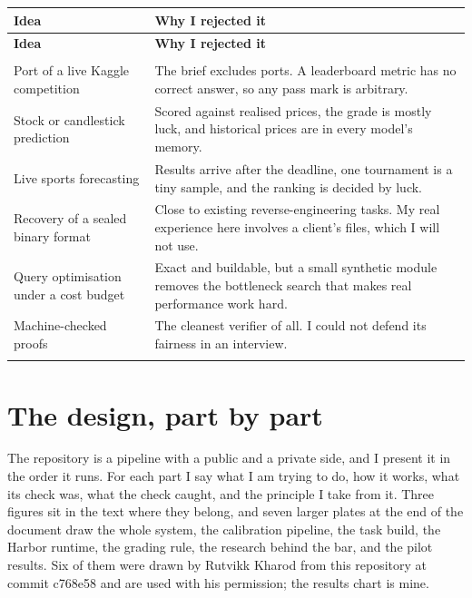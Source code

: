 \documentclass[11pt,letterpaper]{article}
\begin{document}
\begin{small}
\begin{longtable}{>{\raggedright\arraybackslash}p{}>{\raggedright\arraybackslash}p{}}
\toprule
\textbf{Idea} & \textbf{Why I rejected it} \\ \midrule
\endfirsthead
\toprule
\textbf{Idea} & \textbf{Why I rejected it} \\ \midrule
\endhead
\midrule \multicolumn{2}{r}{\footnotesize continued on the next page} \\ \endfoot
\bottomrule \endlastfoot
Port of a live Kaggle competition & The brief excludes ports. A leaderboard metric has no correct answer, so any pass mark is arbitrary. \\ \addlinespace[2pt]
Stock or candlestick prediction & Scored against realised prices, the grade is mostly luck, and historical prices are in every model's memory. \\ \addlinespace[2pt]
Live sports forecasting & Results arrive after the deadline, one tournament is a tiny sample, and the ranking is decided by luck. \\ \addlinespace[2pt]
Recovery of a sealed binary format & Close to existing reverse-engineering tasks. My real experience here involves a client's files, which I will not use. \\ \addlinespace[2pt]
Query optimisation under a cost budget & Exact and buildable, but a small synthetic module removes the bottleneck search that makes real performance work hard. \\ \addlinespace[2pt]
Machine-checked proofs & The cleanest verifier of all. I could not defend its fairness in an interview. \\ \addlinespace[2pt]
\end{longtable}
\end{small}

\section{The design, part by part}

The repository is a pipeline with a public and a private side, and I present it in the order it runs. For each part I say what I am trying to do, how it works, what its check was, what the check caught, and the principle I take from it. Three figures sit in the text where they belong, and seven larger plates at the end of the document draw the whole system, the calibration pipeline, the task build, the Harbor runtime, the grading rule, the research behind the bar, and the pilot results. Six of them were drawn by Rutvikk Kharod from this repository at commit c768e58 and are used with his permission; the results chart is mine.
\end{document}
